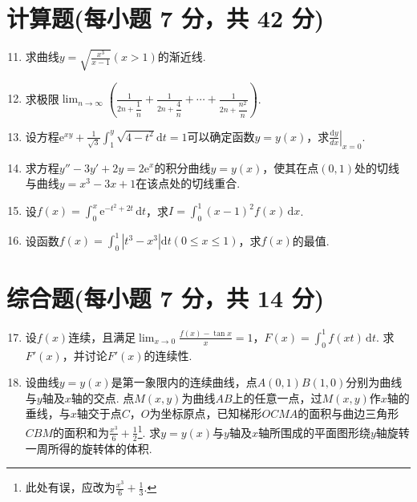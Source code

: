 \documentclass[../Main.tex]{subfiles}
\begin{document}
\section{计算题(每小题 7 分，共 42 分)}
\begin{enumerate}
    \setcounter{enumi}{10}
    \item 求曲线$y=\sqrt{\frac{x^{3}}{x-1}}(x>1)$的渐近线.
          \vspace{10em}

    \item 求极限$\lim_{n\to\infty}\left(\frac{1}{2n+\dfrac{1}{n}}+\frac{1}{2n+\dfrac{4}{n}}
              +\cdots+\frac{1}{2n+\dfrac{n^2}{n}}\right)$.
          \vspace{10em}

    \item 设方程$\mathrm{e}^{xy}+\frac{1}{\sqrt{3}}\int_{1}^{y}\sqrt{4-t^{2}}
              \mathrm{d}t=1$可以确定函数$y=y(x)$，求$\left.\frac{\mathrm{d}y}{dx}\right|_{x=0}$.
          \vspace{10em}

    \item 求方程$y''-3y'+2y=2\mathrm{e}^{x}$的积分曲线$y=y(x)$，使其在点$(0,
              1)$处的切线与曲线$y=x^{3}-3x+1$在该点处的切线重合.
          \vspace{12em}

    \item 设$f(x)=\int_{0}^{x}\mathrm{e}^{-t^2+2t}\,\mathrm{d}t$，求$I=\int_{0}
              ^{1}(x-1)^{2} f(x)\,\mathrm{d}x$.
          \vspace{12em}

    \item 设函数$f(x)=\int_{0}^{1}|t^{3}-x^{3}|\mathrm{d}t(0\leq x\leq 1)$，求$f
              (x)$的最值.
          \vspace{12em}
\end{enumerate}

\section{综合题(每小题 7 分，共 14 分)}
\begin{enumerate}
    \setcounter{enumi}{16}
    \item 设$f(x)$连续，且满足$\lim_{x\to 0}\frac{f(x)-\tan x}{x}=1$，$F(x)=
              \int_{0}^{1}f(xt)\,\mathrm{d}t$. 求$F'(x)$，并讨论$F'(x)$的连续性.
          \vspace{12em}

    \item 设曲线$y=y(x)$是第一象限内的连续曲线，点$A(0,1)B(1,0)$分别为曲线与$y$轴及$x$轴的交点.
          点$M(x,y)$为曲线$AB$上的任意一点，过$M(x,y)$作$x$轴的垂线，与$x$轴交于点$C$，$O$为坐标原点，已知梯形$O
              CMA$的面积与曲边三角形$CBM$的面积和为$\frac{x^{3}}{6}+\frac{1}{2}$\footnote{此处有误，应改为$\frac{x^{3}}{6}
                  +\frac{1}{3}$.}. 求$y=y(x)$与$y$轴及$x$轴所围成的平面图形绕$y$轴旋转一周所得的旋转体的体积.
          \vspace{13em}
\end{enumerate}
\end{document}
